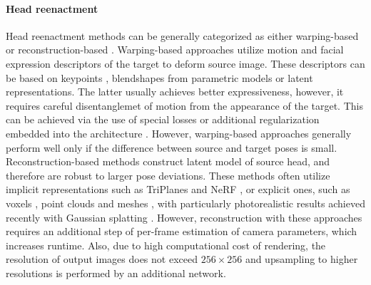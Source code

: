 \paragraph{Head reenactment} 
Head reenactment methods can be generally categorized as either warping-based \cite{Siarohin_2019_NeurIPS, zakharov2020fast, Drobyshev22MP, zhang2022metaportrait, wang2022latent} or reconstruction-based \cite{zielonka2022insta, NEURIPS2023_937ae0e8, qian2024gaussianavatars, chu2024gpavatar, deng2024portrait4d}. Warping-based approaches utilize motion and facial expression descriptors of the target to deform source image. These descriptors can be based on keypoints \cite{Siarohin_2019_NeurIPS, zakharov2020fast}, blendshapes from parametric models \cite{ren2021pirenderer, yin2022styleheat} or latent representations. The latter usually achieves better expressiveness, however, it requires careful disentanglemet of motion from the appearance of the target. This can be achieved via the use of special losses \cite{Drobyshev22MP, drobyshev2024emoportraits, Pang_2023_CVPR} or additional regularization embedded into the architecture \cite{Pang_2023_CVPR}. However, warping-based approaches generally perform well only if the difference between source and target poses is small.
Reconstruction-based methods \cite{zielonka2022insta, NEURIPS2023_937ae0e8, qian2024gaussianavatars, chu2024gpavatar, deng2024portrait4d} construct latent model of source head, and therefore are robust to larger pose deviations. These methods often utilize implicit representations such as TriPlanes \cite{ma2023otavatar, ye2024real3dportrait} and NeRF \cite{zielonka2022insta, zheng2022imavatar, bai2023learning}, or explicit  ones, such as voxels \cite{xu2023avatarmav}, point clouds \cite{zheng2023pointavatar} and meshes \cite{Khakhulin2022ROME, grassal2022neural}, with particularly photorealistic results achieved recently with Gaussian splatting \cite{qian2024gaussianavatars, giebenhain2024npga}. However, reconstruction with these approaches requires an additional step of per-frame estimation of camera parameters, which increases runtime. Also, due to high computational cost of rendering, the resolution of output images does not exceed $256 \times 256$ and upsampling to higher resolutions is performed by an additional network.